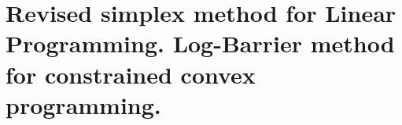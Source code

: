 \chapter{Revised simplex method for Linear Programming. Log-Barrier method for constrained convex programming.}
